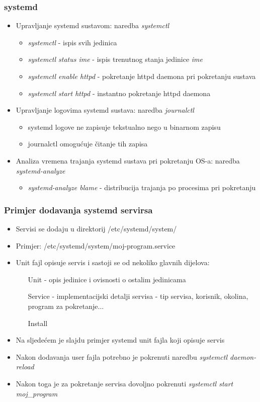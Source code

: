 \documentclass[t]{beamer}
\begin{document}
\begin{frame}
	\frametitle{systemd}
	\begin{itemize}
		\item Upravljanje systemd sustavom: naredba \textit{systemctl}
			\begin{itemize}
				\item \textit{systemctl} - ispis svih jedinica
				\item \textit{systemctl status ime} - ispis trenutnog stanja jedinice \textit{ime}
				\item \textit{systemctl enable httpd} - pokretanje httpd daemona pri pokretanju sustava
				\item \textit{systemctl start httpd} - instantno pokretanje httpd daemona
			\end{itemize}
		\item Upravljanje logovima systemd sustava: naredba \textit{journalctl}
			\begin{itemize}
				\item systemd logove ne zapisuje tekstualno nego u binarnom zapisu
				\item journalctl omogućuje čitanje tih zapisa
			\end{itemize}
		\item Analiza vremena trajanja systemd sustava pri pokretanju OS-a: naredba \textit{systemd-analyze}
			\begin{itemize}
				\item \textit{systemd-analyze blame} - distribucija trajanja po procesima pri pokretanju
			\end{itemize}
		
	\end{itemize}
\end{frame}

\begin{frame}
	\frametitle{Primjer dodavanja systemd servirsa}
	\begin{itemize}
		\item Servisi se dodaju u direktorij /etc/systemd/system/
		\item Primjer: /etc/systemd/system/moj-program.service
		\item Unit fajl opisuje servis i sastoji se od nekoliko glavnih dijelova:
		\begin{itemize}
			\item [Unit] - opis jedinice i ovisnosti o ostalim jedinicama
			\item [Service] - implementacijski detalji servisa - tip servisa, korisnik, okolina, program za pokretanje...
			\item [Install] 
		\end{itemize}
		\item Na sljedećem je slajdu primjer systemd unit fajla koji opisuje servis
		\item Nakon dodavanja user fajla potrebno je pokrenuti naredbu \textit{systemctl daemon-reload}
		\item Nakon toga je za pokretanje servisa dovoljno pokrenuti \textit{systemctl start moj\_program}
	\end{itemize}
\end{frame}
\end{document}
